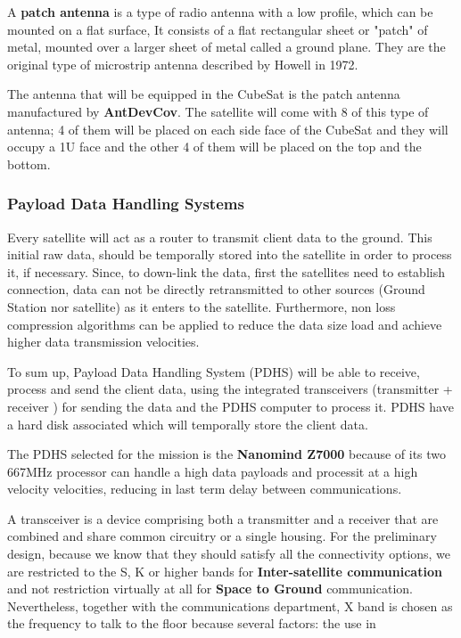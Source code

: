 A \textbf{patch antenna} is a type of radio antenna with a low profile, which can be mounted on a flat surface, It consists of a flat rectangular sheet or "patch" of metal, mounted over a larger sheet of metal called a ground plane. They are the original type of microstrip antenna described by Howell in 1972. \cite{patch}

The antenna that will be equipped in the CubeSat is the patch antenna manufactured by \textbf{AntDevCov}. The satellite will come with 8 of this type of antenna; 4 of them will be placed on each side face of the CubeSat and they will occupy a 1U face and the other 4 of them will be placed on the top and the bottom.

\subsubsection{Payload Data Handling Systems}
Every satellite will act as a router to transmit client data to the ground. This initial raw data, should be temporally stored into the satellite in order to process it, if necessary. Since, to down-link the data, first the satellites need to establish connection, data can not be directly retransmitted to other sources (Ground Station nor satellite) as it enters to the satellite. Furthermore, non loss compression algorithms can be applied to reduce the data size load and achieve higher data transmission velocities.

To sum up, Payload Data Handling System (PDHS) will be able to receive, process and send the client data, using the integrated transceivers (transmitter + receiver )  for sending the data and the PDHS computer to process it. PDHS have a hard disk associated which will temporally store the client data.

The PDHS selected for the mission is the \textbf{Nanomind Z7000} because of its two 667MHz processor can handle a high data payloads and processit at a high velocity velocities, reducing in last term delay between communications. 

A transceiver is a device comprising both a transmitter and a receiver that are combined and share common circuitry or a single housing. For the preliminary design, because we know that they should satisfy all the connectivity options, we are restricted to the S, K or higher bands for \textbf{Inter-satellite communication} and not restriction virtually at all for \textbf{Space to Ground} communication. Nevertheless, together with the communications department, X band is chosen as the frequency to talk to the floor because several factors: the use in 

